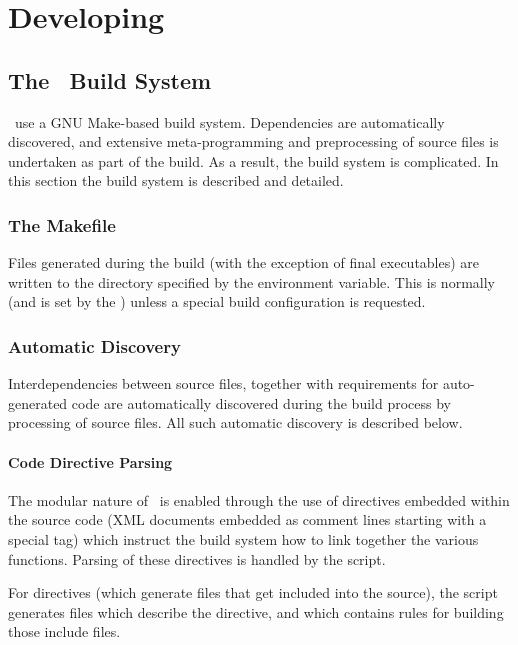 \chapter{Developing \glc}

\section{The \glc\ Build System}

\glc\ use a GNU Make-based build system. Dependencies are automatically discovered, and extensive meta-programming and preprocessing of source files is undertaken as part of the build. As a result, the build system is complicated. In this section the build system is described and detailed.

\subsection{The Makefile}

Files generated during the build (with the exception of final executables) are written to the directory specified by the  environment variable. This is normally  (and is set by the ) unless a special build configuration is requested.

\subsection{Automatic Discovery}

Interdependencies between source files, together with requirements for auto-generated code are automatically discovered during the build process by processing of source files. All such automatic discovery is described below.

\subsubsection{Code Directive Parsing}\label{sec:buildDiscoveryDirectives}

The modular nature of \glc\ is enabled through the use of directives embedded within the source code (XML documents embedded as comment lines starting with a special tag) which instruct the build system how to link together the various functions. Parsing of these directives is handled by the  script.

For  directives (which generate files that get included into the source), the script generates  files which describe the directive, and  which contains rules for building those include files.

